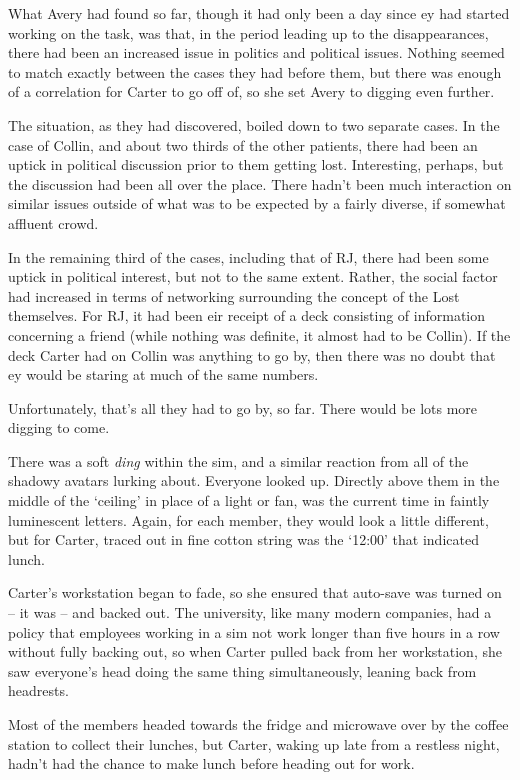 What Avery had found so far, though it had only been a day since ey had started working on the task, was that, in the period leading up to the disappearances, there had been an increased issue in politics and political issues. Nothing seemed to match exactly between the cases they had before them, but there was enough of a correlation for Carter to go off of, so she set Avery to digging even further.

The situation, as they had discovered, boiled down to two separate cases. In the case of Collin, and about two thirds of the other patients, there had been an uptick in political discussion prior to them getting lost. Interesting, perhaps, but the discussion had been all over the place. There hadn't been much interaction on similar issues outside of what was to be expected by a fairly diverse, if somewhat affluent crowd.

In the remaining third of the cases, including that of RJ, there had been some uptick in political interest, but not to the same extent. Rather, the social factor had increased in terms of networking surrounding the concept of the Lost themselves. For RJ, it had been eir receipt of a deck consisting of information concerning a friend (while nothing was definite, it almost had to be Collin). If the deck Carter had on Collin was anything to go by, then there was no doubt that ey would be staring at much of the same numbers.

Unfortunately, that's all they had to go by, so far. There would be lots more digging to come.

There was a soft \textit{ding} within the sim, and a similar reaction from all of the shadowy avatars lurking about. Everyone looked up. Directly above them in the middle of the `ceiling' in place of a light or fan, was the current time in faintly luminescent letters. Again, for each member, they would look a little different, but for Carter, traced out in fine cotton string was the `12:00' that indicated lunch.

Carter's workstation began to fade, so she ensured that auto-save was turned on -- it was -- and backed out. The university, like many modern companies, had a policy that employees working in a sim not work longer than five hours in a row without fully backing out, so when Carter pulled back from her workstation, she saw everyone's head doing the same thing simultaneously, leaning back from headrests.

Most of the members headed towards the fridge and microwave over by the coffee station to collect their lunches, but Carter, waking up late from a restless night, hadn't had the chance to make lunch before heading out for work.

